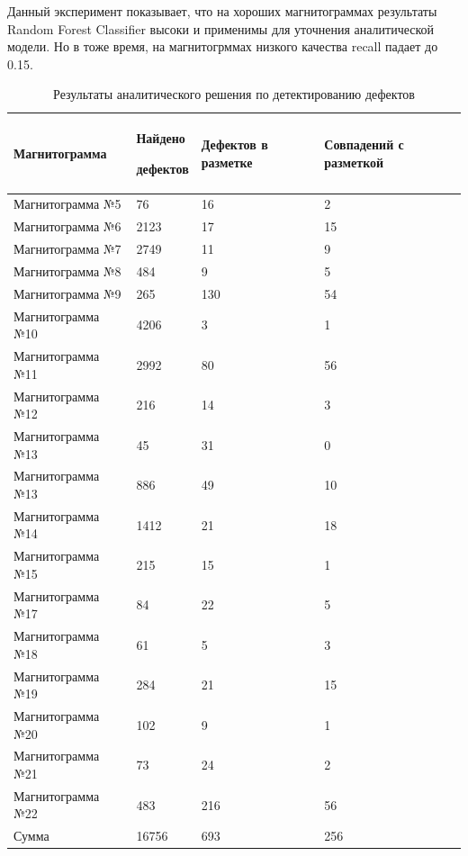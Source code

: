 \documentclass[a4paper,article,14pt]{extarticle}
\begin{document}
Данный эксперимент показывает, что на хороших магнитограммах результаты Random Forest Classifier 
высоки и применимы для уточнения аналитической модели. Но в тоже время, на магнитогрммах низкого 
качества recall падает до 0.15.

\begin{center}
    \begin{longtable}{|p{5cm}|p{3cm}|p{3cm}|p{3cm}|}
        \caption{Результаты аналитического решения по детектированию дефектов}\\\hline
        Магнитограмма & Найдено\par дефектов & Дефектов в разметке & Совпадений с разметкой \\ \hline
        Магнитограмма №5	& 76	& 16	& 2 \\ \hline
        Магнитограмма №6	& 2123	& 17	& 15 \\ \hline
        Магнитограмма №7	& 2749	& 11  	& 9 \\ \hline
        Магнитограмма №8	& 484	& 9	    & 5 \\ \hline
        Магнитограмма №9	& 265	& 130	& 54 \\ \hline
        Магнитограмма №10	& 4206	& 3	    & 1 \\ \hline
        Магнитограмма №11	& 2992	& 80	& 56 \\ \hline
        Магнитограмма №12	& 216	& 14	& 3 \\ \hline
        Магнитограмма №13	& 45	& 31	& 0 \\ \hline
        Магнитограмма №13	& 886	& 49	& 10 \\ \hline
        Магнитограмма №14	& 1412	& 21	& 18 \\ \hline
        Магнитограмма №15	& 215	& 15	& 1 \\ \hline
        Магнитограмма №17	& 84	& 22	& 5 \\ \hline
        Магнитограмма №18	& 61	& 5	    & 3 \\ \hline
        Магнитограмма №19	& 284	& 21	& 15 \\ \hline
        Магнитограмма №20	& 102	& 9	    & 1 \\ \hline
        Магнитограмма №21	& 73	& 24	& 2 \\ \hline
        Магнитограмма №22	& 483	& 216	& 56 \\ \hline
        Сумма	& 16756	& 693	& 256 \\ \hline
    \end{longtable}
\end{center}
\end{document}
